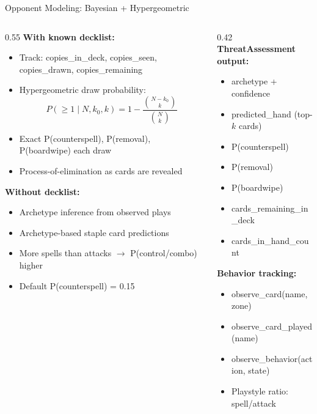 \documentclass[aspectratio=169, 10pt]{beamer}
\begin{document}
\begin{frame}{Opponent Modeling: Bayesian + Hypergeometric}
  \begin{columns}[T]
    \begin{column}{0.55\textwidth}
      \footnotesize
      \textbf{With known decklist:}
      \begin{itemize}\scriptsize
        \item Track: copies\_in\_deck, copies\_seen, copies\_drawn, copies\_remaining
        \item Hypergeometric draw probability:
          $$P(\geq 1 \mid N, k_0, k) = 1 - \frac{\binom{N-k_0}{k}}{\binom{N}{k}}$$
        \item Exact P(counterspell), P(removal), P(boardwipe) each draw
        \item Process-of-elimination as cards are revealed
      \end{itemize}
      \vspace{0.2cm}
      \textbf{Without decklist:}
      \begin{itemize}\scriptsize
        \item Archetype inference from observed plays
        \item Archetype-based staple card predictions
        \item More spells than attacks $\to$ P(control/combo) higher
        \item Default P(counterspell) = 0.15
      \end{itemize}
    \end{column}
    \begin{column}{0.42\textwidth}
      \footnotesize
      \textbf{ThreatAssessment output:}
      \begin{itemize}\scriptsize
        \item archetype + confidence
        \item predicted\_hand (top-$k$ cards)
        \item P(counterspell)
        \item P(removal)
        \item P(boardwipe)
        \item cards\_remaining\_in\_deck
        \item cards\_in\_hand\_count
      \end{itemize}
      \vspace{0.15cm}
      \textbf{Behavior tracking:}
      \begin{itemize}\scriptsize
        \item observe\_card(name, zone)
        \item observe\_card\_played(name)
        \item observe\_behavior(action, state)
        \item Playstyle ratio: spell/attack
      \end{itemize}
    \end{column}
  \end{columns}
\end{frame}
\end{document}
